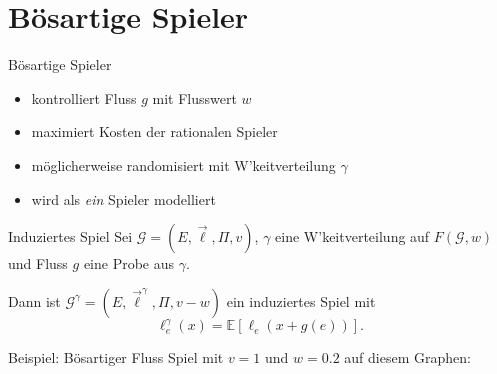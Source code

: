 \documentclass{beamer}
\begin{document}
\section{Bösartige Spieler}
\begin{frame}{Bösartige Spieler}
	\begin{itemize}
		\item kontrolliert Fluss $g$ mit Flusswert $w$
		\item maximiert Kosten der rationalen Spieler
		\item möglicherweise randomisiert mit W'keitverteilung $\gamma$
		\item wird als \emph{ein} Spieler modelliert
	\end{itemize}
\end{frame}

\begin{frame}{Induziertes Spiel}
	Sei $\mathcal G = (E, \vec{\ell}, \Pi, v)$, $\gamma$ eine W'keitverteilung auf $F(\mathcal G, w)$ und Fluss $g$ eine Probe aus $\gamma$. 
	
	Dann ist $\mathcal G^\gamma = (E, \vec{\ell}^\gamma, \Pi, v-w)$ ein \alert{induziertes Spiel} mit 
	\[ \ell_e^\gamma(x) = \mathbb E[\ell_e(x+ g(e))] .\]
\end{frame}

\begin{frame}{Beispiel: Bösartiger Fluss}
	Spiel mit $v = 1$ und $w = 0.2$ auf diesem Graphen:
	\begin{figure}
	\end{figure}
\end{frame}
\end{document}
